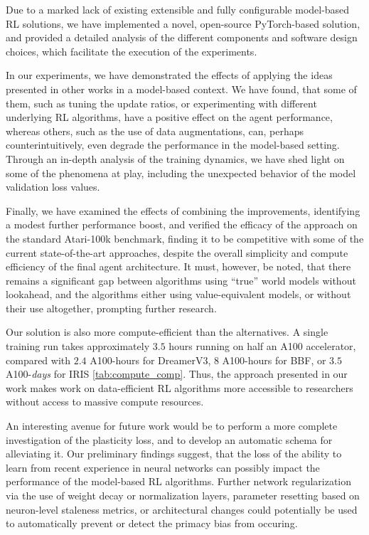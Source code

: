 \documentclass[en]{pracamgr}
\begin{document}
Due to a marked lack of existing extensible and fully configurable model-based RL solutions, we have implemented a novel, open-source PyTorch-based solution, and provided a detailed analysis of the different components and software design choices, which facilitate the execution of the experiments.

In our experiments, we have demonstrated the effects of applying the ideas presented in other works in a model-based context. We have found, that some of them, such as tuning the update ratios, or experimenting with different underlying RL algorithms, have a positive effect on the agent performance, whereas others, such as the use of data augmentations, can, perhaps counterintuitively, even degrade the performance in the model-based setting. Through an in-depth analysis of the training dynamics, we have shed light on some of the phenomena at play, including the unexpected behavior of the model validation loss values.

Finally, we have examined the effects of combining the improvements, identifying a modest further performance boost, and verified the efficacy of the approach on the standard Atari-100k benchmark, finding it to be competitive with some of the current state-of-the-art approaches, despite the overall simplicity and compute efficiency of the final agent architecture. It must, however, be noted, that there remains a significant gap between algorithms using ``true'' world models without lookahead, and the algorithms either using value-equivalent models, or without their use altogether, prompting further research.

Our solution is also more compute-efficient than the alternatives. A single training run takes approximately $3.5$ hours running on half an A100 accelerator, compared with $2.4$ A100-hours for DreamerV3, $8$ A100-hours for BBF, or $3.5$ A100-\emph{days} for IRIS \autoref{tab:compute_comp}. Thus, the approach presented in our work makes work on data-efficient RL algorithms more accessible to researchers without access to massive compute resources.

An interesting avenue for future work would be to perform a more complete investigation of the plasticity loss, and to develop an automatic schema for alleviating it. Our preliminary findings suggest, that the loss of the ability to learn from recent experience in neural networks can possibly impact the performance of the model-based RL algorithms. Further network regularization via the use of weight decay or normalization layers, parameter resetting based on neuron-level staleness metrics, or architectural changes could potentially be used to automatically prevent or detect the primacy bias from occuring.
\end{document}
